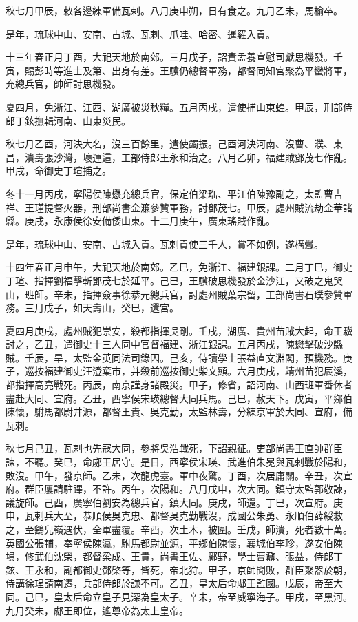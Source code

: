 \begin{pinyinscope}
秋七月甲辰，敕各邊練軍備瓦剌。八月庚申朔，日有食之。九月乙未，馬榆卒。

是年，琉球中山、安南、占城、瓦剌、爪哇、哈密、暹羅入貢。

十三年春正月丁酉，大祀天地於南郊。三月戊子，詔責孟養宣慰司獻思機發。壬寅，賜彭時等進士及第、出身有差。王驥仍總督軍務，都督同知宮聚為平蠻將軍，充總兵官，帥師討思機發。

夏四月，免浙江、江西、湖廣被災秋糧。五月丙戌，遣使捕山東蝗。甲辰，刑部侍郎丁鉉撫輯河南、山東災民。

秋七月乙酉，河決大名，沒三百餘里，遣使蠲振。己酉河決河南、沒曹、濮、東昌，潰壽張沙灣，壞運這，工部侍郎王永和治之。八月乙卯，福建賊鄧茂七作亂。甲戌，命御史丁瑄捕之。

冬十一月丙戌，寧陽侯陳懋充總兵官，保定伯梁珤、平江伯陳豫副之，太監曹吉祥、王瑾提督火器，刑部尚書金濂參贊軍務，討鄧茂七。甲辰，處州賊流劫金華諸縣。庚戌，永康侯徐安備倭山東。十二月庚午，廣東瑤賊作亂。

是年，琉球中山、安南、占城入貢。瓦剌貢使三千人，賞不如例，遂構釁。

十四年春正月申午，大祀天地於南郊。乙巳，免浙江、福建銀課。二月丁巳，御史丁瑄、指揮劉福擊斬鄧茂七於延平。己巳，王驥破思機發於金沙江，又破之鬼哭山，班師。辛未，指揮僉事徐恭元總兵官，討處州賊葉宗留，工部尚書石璞參贊軍務。三月戊子，如天壽山，癸巳，還宮。

夏四月庚戌，處州賊犯崇安，殺都指揮吳剛。壬戌，湖廣、貴州苗賊大起，命王驥討之，乙丑，遣御史十三人同中官督福建、浙江銀課。五月丙戌，陳懋擊破沙縣賊。壬辰，旱，太監金英同法司錄囚。己亥，侍讀學士張益直文淵閣，預機務。庚子，巡按福建御史汪澄棄市，并殺前巡按御史柴文顯。六月庚戌，靖州苗犯辰溪，都指揮高亮戰死。丙辰，南京謹身諸殿災。甲子，修省，詔河南、山西班軍番休者盡赴大同、宣府。乙丑，西寧侯宋瑛總督大同兵馬。己巳，赦天下。戊寅，平鄉伯陳懷，駙馬都尉井源，都督王貴、吳克勤，太監林壽，分練京軍於大同、宣府，備瓦剌。

秋七月己丑，瓦剌也先寇大同，參將吳浩戰死，下詔親征。吏部尚書王直帥群臣諫，不聽。癸巳，命郕王居守。是日，西寧侯宋瑛、武進伯朱冕與瓦剌戰於陽和，敗沒。甲午，發京師。乙未，次龍虎臺。軍中夜驚。丁酉，次居庸關。辛丑，次宣府。群臣屢請駐蹕，不許。丙午，次陽和。八月戊申，次大同。鎮守太監郭敬諫，議旋師。己酉，廣寧伯劉安為總兵官，鎮大同。庚戌，師還。丁巳，次宣府。庚申，瓦剌兵大至，恭順侯吳克忠、都督吳克勤戰沒，成國公朱勇、永順伯薛綬救之，至鷂兒嶺遇伏，全軍盡覆。辛酉，次土木，被圍。壬戌，師潰，死者數十萬。英國公張輔，奉寧侯陳瀛，駙馬都尉並源，平鄉伯陳懷，襄城伯李珍，遂安伯陳塤，修武伯沈榮，都督梁成、王貴，尚書王佐、鄺野，學士曹鼐、張益，侍郎丁鉉、王永和，副都御史鄧棨等，皆死，帝北狩。甲子，京師聞敗，群臣聚器於朝，侍講徐珵請南遷，兵部侍郎於謙不可。乙丑，皇太后命郕王監國。戊辰，帝至大同。己巳，皇太后命立皇子見深為皇太子。辛未，帝至威寧海子。甲戌，至黑河。九月癸未，郕王即位，遙尊帝為太上皇帝。


\end{pinyinscope}